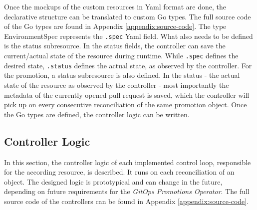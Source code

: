Once the mockups of the custom resources in Yaml format are done,
the declarative structure can be translated to custom Go types.
The full source code of the Go types are found in Appendix \ref{appendix:source-code}.
The type EnvironmentSpec represents the \lstinline|.spec| Yaml field.
What also needs to be defined is the status subresource.
In the status fields, the controller can save the current/actual state
of the resource during runtime.
While \lstinline|.spec| defines the desired state,
\lstinline|.status| defines the actual state, as observed by the controller.
For the promotion,
a status subresource is also defined.
In the status - the actual state of the resource as observed by the controller -
most importantly the metadata of the currently opened pull request is saved,
which the controller will pick up on every consecutive reconciliation
of the same promotion object.
Once the Go types are defined,
the controller logic can be written.

\subsection{Controller Logic}
\label{prototype:design:controller-logic}

In this section,
the controller logic of each implemented control loop, responsible for the according resource,
is described.
It runs on each reconciliation of an object.
The designed logic is prototypical and can change in the future, depending on future requirements
for the \textit{GitOps Promotions Operator}.
The full source code of the controllers can be found in Appendix
\ref{appendix:source-code}.


